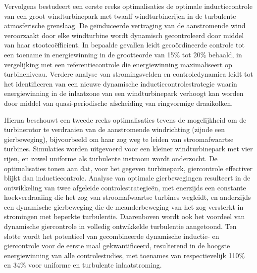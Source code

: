 Vervolgens bestudeert een eerste reeks optimalisaties de optimale inductiecontrole van een groot windturbinepark met twaalf windturbinerijen in de turbulente atmosferische grenslaag. De ge\"induceerde vertraging van de aanstromende wind veroorzaakt door elke windturbine wordt dynamisch gecontroleerd door middel van haar stootco\"efficient. In bepaalde gevallen leidt geco\"ordineerde controle tot een toename in energiewinning in de grootteorde van 15\% tot 20\% behaald, in vergelijking met een referentiecontrole die energiewinning maximaliseert op turbineniveau. Verdere analyse van stromingsvelden en controledynamica leidt tot het identificeren van een nieuwe dynamische inductiecontrolestrategie waarin energiewinning in de inlaatzone van een windturbinepark verhoogt kan worden door middel van quasi-periodische afscheiding van ringvormige draaikolken. 

Hierna beschouwt een tweede reeks optimalisaties tevens de mogelijkheid om de turbinerotor te verdraaien van de aanstromende windrichting (zijnde een gierbeweging), bijvoorbeeld om haar zog weg te leiden van stroomafwaartse turbines. Simulaties worden uitgevoerd voor een kleiner windturbinepark met vier rijen, en zowel uniforme als turbulente instroom wordt onderzocht. De optimalisaties tonen aan dat, voor het gegeven turbinepark, giercontrole effectiver blijkt dan inductiecontrole. Analyse van optimale gierbewegingen resulteert in de ontwikkeling van twee afgeleide controlestrategie\"en, met enerzijds een constante hoekverdraaiing die het zog van stroomafwaartse turbines wegleidt, en anderzijds een dynamische gierbeweging die de meanderbeweging van het zog versterkt in stromingen met beperkte turbulentie. Daarenboven wordt ook het voordeel van dynamische giercontrole in volledig ontwikkelde turbulentie aangetoond. Ten slotte wordt het potentieel van gecombineerde dynamische inductie- en giercontrole voor de eerste maal gekwantificeerd, resulterend in de hoogste energiewinning van alle controlestudies, met toenames van respectievelijk 110\% en 34\% voor uniforme en turbulente inlaatstroming. 
\cleardoublepage

